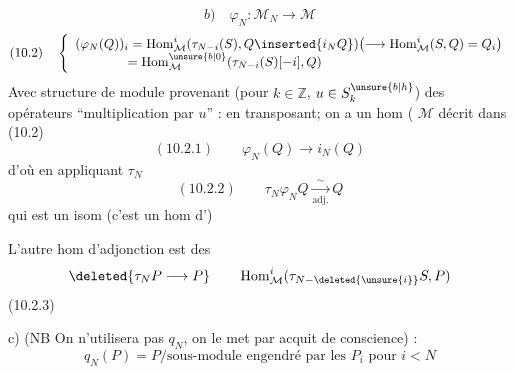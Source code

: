 \[
b)\quad\varphi_N:\mathcal M_N\longrightarrow\mathcal M
\]
\[
(10.2)\quad\left\{\begin{array}{l}
(\varphi_N(Q))_i=\operatorname{Hom}^i_{\mathcal M}(\tau_{N-i}(S),Q\inserted{i_NQ})
\bigl(\longrightarrow\operatorname{Hom}^i_{\mathcal M}(S,Q)=Q_i\bigr)\\
\hspace{4em}=\operatorname{Hom}^{\unsure{b|0}}_{\mathcal M}(\tau_{N-i}(S)[-i],Q)
\end{array}\right.
\]
Avec  structure de module provenant (pour $k\in\mathbb Z$, $u\in S_k^{\unsure{b|h}}$) des opérateurs ``multiplication par $u$'' :
en transposant; on a un hom (  $\mathcal M$ décrit dans (10.2)
\[
(10.2.1)\qquad\varphi_N(Q)\longrightarrow i_N(Q)
\]
d'où en appliquant $\tau_N$
\[
(10.2.2)\qquad\tau_N\varphi_NQ\underset{\text{adj.}}{\overset{\sim}{\longrightarrow}}Q
\]
qui est un isom (c'est un hom d')

L'autre hom d'adjonction
est  des  
\[
\deleted{\tau_NP\longrightarrow P}\qquad\operatorname{Hom}^i_{\mathcal M}(\tau_{N-\deleted{\unsure{i}}}S,P)
\]
(10.2.3)

c) (NB On n'utilisera pas $q_N$, on le met par acquit de conscience) :
\[
q_N(P)=P/\text{sous-module engendré par les }P_i\text{ pour }i<N
\]
